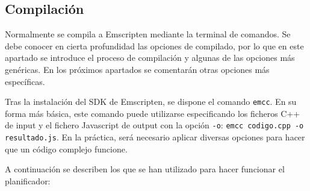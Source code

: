 
\subsection{Compilación}
Normalmente se compila a Emscripten mediante la terminal de comandos. Se debe conocer en cierta profundidad las opciones de compilado, por lo que en este apartado se introduce el proceso de compilación y algunas de las opciones más genéricas. En los próximos apartados se comentarán otras opciones más específicas.

Tras la instalación del SDK de Emscripten, se dispone el comando \texttt{emcc}. En su forma más básica, este comando puede utilizarse especificando los ficheros C++ de input y el fichero Javascript de output con la opción \texttt{-o}: \texttt{emcc codigo.cpp -o resultado.js}. En la práctica, será necesario aplicar diversas opciones para hacer que un código complejo funcione.

A continuación se describen los que se han utilizado para hacer funcionar el planificador:

